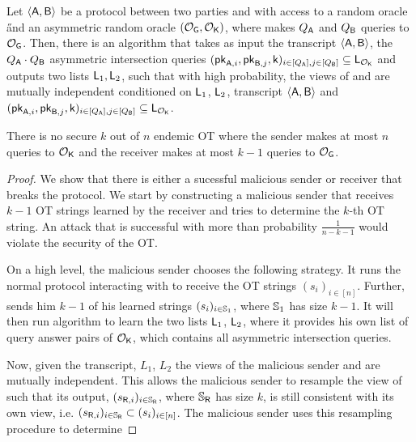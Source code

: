 \begin{lemma}
Let $\langle \mathsf{A}, \mathsf{B}\rangle$ be a protocol between two parties \A and \B with access to a random oracle \H and an asymmetric random oracle $(\mathcal O_{\mathsf{G}}, \mathcal O_{\mathsf{K}})$, where \A makes $Q_{\mathsf{A}}$ and \B $Q_{\mathsf{B}}$ queries to $\mathcal O_{\mathsf{G}}$. Then, there is an algorithm \E that takes as input the transcript $\langle \mathsf{A}, \mathsf{B}\rangle$, the $Q_{\mathsf{A}}\cdot Q_{\mathsf{B}}$ asymmetric intersection queries $(\mathsf{pk}_{\mathsf{A},i},\mathsf{pk}_{\mathsf{B},j},\mathsf{k})_{i\in[Q_{\mathsf{A}}],j\in[Q_{\mathsf{B}}]}\subseteq\mathsf{L}_{\mathcal O_{\mathsf{K}}}$ and outputs two lists $\mathsf{L}_1, \mathsf{L}_2$, such that with high probability, the views of \A and \B are mutually independent conditioned on $\mathsf{L}_1$, $\mathsf{L}_2$, transcript $\langle \mathsf{A}, \mathsf{B}\rangle$ and $(\mathsf{pk}_{\mathsf{A},i},\mathsf{pk}_{\mathsf{B},j},\mathsf{k})_{i\in[Q_{\mathsf{A}}],j\in[Q_{\mathsf{B}}]}\subseteq\mathsf{L}_{\mathcal O_{\mathsf{K}}}$.
\end{lemma}



\begin{theorem}
There is no secure $k$ out of $n$ endemic OT where the sender makes at most $n$ queries to $\mathcal O_{\mathsf{K}}$ and the receiver makes at most $k-1$ queries to $\mathcal O_{\mathsf{G}}$. 
\end{theorem}

\begin{proof}
We show that there is either a sucessful malicious sender or receiver that breaks the protocol. We start by constructing a malicious sender that receives $k-1$ OT strings learned by the receiver and tries to determine the $k$-th OT string. An attack that is successful with more than probability $\frac{1}{n-k-1}$ would violate the security of the OT. 

On a high level, the malicious sender chooses the following strategy. It runs the normal protocol interacting with \rec to receive the OT strings $(s_i)_{i\in[n]}$. Further, \rec sends him $k-1$ of his learned strings $(s_i)_{i\in\mathsf{\mathbb S}_1}$, where $\mathsf{\mathbb S}_1$ has size $k-1$. It will then run algorithm \E to learn the two lists $\mathsf{L}_1$, $\mathsf{L}_2$, where it provides \E his own list of query answer pairs of $\mathcal O_{\mathsf{K}}$, which contains all asymmetric intersection queries. 

Now, given the transcript, $L_1$, $L_2$ the views of the malicious sender and \rec are mutually independent. This allows the malicious sender to resample the view of \rec such that its output, $(s_{\mathsf{R},i})_{i\in\mathsf{\mathbb S}_{\mathsf{R}}}$, where $\mathsf{\mathbb S}_{\mathsf{R}}$ has size $k$, is still consistent with its own view, i.e. $(s_{\mathsf{R},i})_{i\in\mathsf{\mathbb S}_{\mathsf{R}}}\subset(s_i)_{i\in[n]}$. The malicious sender uses this resampling procedure to determine 
\end{proof}